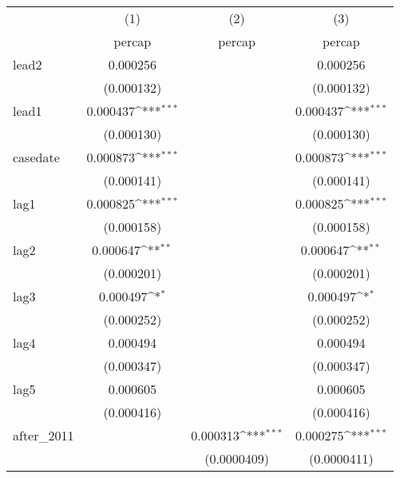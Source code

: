 {
\def\sym#1{\ifmmode^{#1}\else\(^{#1}\)\fi}
\begin{tabular}{l*{3}{c}}
\hline\hline
            &\multicolumn{1}{c}{(1)}&\multicolumn{1}{c}{(2)}&\multicolumn{1}{c}{(3)}\\
            &\multicolumn{1}{c}{percap}&\multicolumn{1}{c}{percap}&\multicolumn{1}{c}{percap}\\
\hline
lead2       &    0.000256         &                     &    0.000256         \\
            &  (0.000132)         &                     &  (0.000132)         \\
[1em]
lead1       &    0.000437\sym{***}&                     &    0.000437\sym{***}\\
            &  (0.000130)         &                     &  (0.000130)         \\
[1em]
casedate    &    0.000873\sym{***}&                     &    0.000873\sym{***}\\
            &  (0.000141)         &                     &  (0.000141)         \\
[1em]
lag1        &    0.000825\sym{***}&                     &    0.000825\sym{***}\\
            &  (0.000158)         &                     &  (0.000158)         \\
[1em]
lag2        &    0.000647\sym{**} &                     &    0.000647\sym{**} \\
            &  (0.000201)         &                     &  (0.000201)         \\
[1em]
lag3        &    0.000497\sym{*}  &                     &    0.000497\sym{*}  \\
            &  (0.000252)         &                     &  (0.000252)         \\
[1em]
lag4        &    0.000494         &                     &    0.000494         \\
            &  (0.000347)         &                     &  (0.000347)         \\
[1em]
lag5        &    0.000605         &                     &    0.000605         \\
            &  (0.000416)         &                     &  (0.000416)         \\
[1em]
after\_2011  &                     &    0.000313\sym{***}&    0.000275\sym{***}\\
            &                     & (0.0000409)         & (0.0000411)         \\

\end{tabular}}
